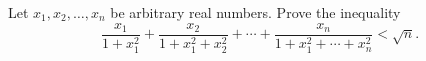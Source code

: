 Let $x_1, x_2, \ldots, x_n$ be arbitrary real numbers. Prove the inequality
\[ \frac{x_1}{1 + x_1^2} + \frac{x_2}{1 + x_1^2 + x_2^2} + \cdots + \frac{x_n}{1 + x_1^2 + \cdots + x_n^2} < \sqrt{n}. \]
